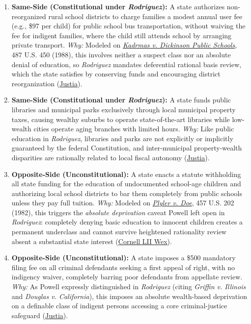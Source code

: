 \documentclass[12pt]{article}
\begin{document}
\begin{enumerate}
\item \textbf{Same-Side (Constitutional under \textit{Rodriguez}):} A state authorizes non-reorganized rural school districts to charge families a modest annual user fee (e.g., \$97 per child) for public school bus transportation, without waiving the fee for indigent families, where the child still attends school by arranging private transport. \emph{Why:} Modeled on \href{https://supreme.justia.com/cases/federal/us/487/450/}{\textit{Kadrmas v. Dickinson Public Schools}}, 487 U.S. 450 (1988), this involves neither a suspect class nor an absolute denial of education, so \textit{Rodriguez} mandates deferential rational basis review, which the state satisfies by conserving funds and encouraging district reorganization (\href{https://supreme.justia.com/cases/federal/us/487/450/}{Justia}).
\item \textbf{Same-Side (Constitutional under \textit{Rodriguez}):} A state funds public libraries and municipal parks exclusively through local municipal property taxes, causing wealthy suburbs to operate state-of-the-art libraries while low-wealth cities operate aging branches with limited hours. \emph{Why:} Like public education in \textit{Rodriguez}, libraries and parks are not explicitly or implicitly guaranteed by the federal Constitution, and inter-municipal property-wealth disparities are rationally related to local fiscal autonomy (\href{https://supreme.justia.com/cases/federal/us/411/1/}{Justia}).
\item \textbf{Opposite-Side (Unconstitutional):} A state enacts a statute withholding all state funding for the education of undocumented school-age children and authorizing local school districts to bar them completely from public schools unless they pay full tuition. \emph{Why:} Modeled on \href{https://www.law.cornell.edu/supremecourt/text/457/202}{\textit{Plyler v. Doe}}, 457 U.S. 202 (1982), this triggers the \emph{absolute deprivation} caveat Powell left open in \textit{Rodriguez}: completely denying basic education to innocent children creates a permanent underclass and cannot survive heightened rationality review absent a substantial state interest (\href{https://www.law.cornell.edu/wex/plyler_v_doe_\%281982\%29}{Cornell LII Wex}).
\item \textbf{Opposite-Side (Unconstitutional):} A state imposes a \$500 mandatory filing fee on all criminal defendants seeking a first appeal of right, with no indigency waiver, completely barring poor defendants from appellate review. \emph{Why:} As Powell expressly distinguished in \textit{Rodriguez} (citing \textit{Griffin v. Illinois} and \textit{Douglas v. California}), this imposes an absolute wealth-based deprivation on a definable class of indigent persons accessing a core criminal-justice safeguard (\href{https://supreme.justia.com/cases/federal/us/411/1/}{Justia}).

\end{enumerate}
\end{document}
